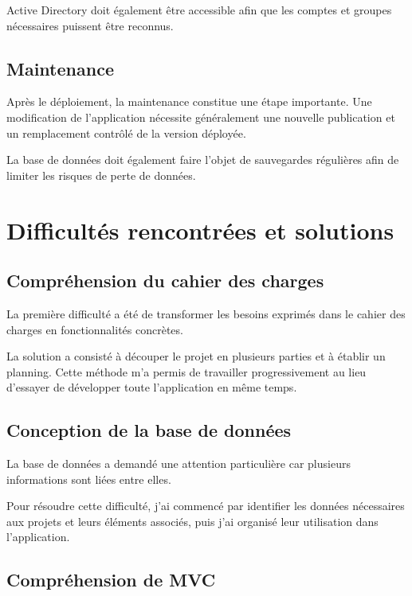 \documentclass[12pt,a4paper,oneside]{report}
\begin{document}
Active Directory doit également être accessible afin que les comptes et groupes nécessaires puissent être reconnus.

\section{Maintenance}

Après le déploiement, la maintenance constitue une étape importante. Une modification de l'application nécessite généralement une nouvelle publication et un remplacement contrôlé de la version déployée.

La base de données doit également faire l'objet de sauvegardes régulières afin de limiter les risques de perte de données.

\chapter{Difficultés rencontrées et solutions}

\section{Compréhension du cahier des charges}

La première difficulté a été de transformer les besoins exprimés dans le cahier des charges en fonctionnalités concrètes.

La solution a consisté à découper le projet en plusieurs parties et à établir un planning. Cette méthode m'a permis de travailler progressivement au lieu d'essayer de développer toute l'application en même temps.

\section{Conception de la base de données}

La base de données a demandé une attention particulière car plusieurs informations sont liées entre elles.

Pour résoudre cette difficulté, j'ai commencé par identifier les données nécessaires aux projets et leurs éléments associés, puis j'ai organisé leur utilisation dans l'application.

\section{Compréhension de MVC}
\end{document}
